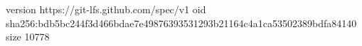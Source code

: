 version https://git-lfs.github.com/spec/v1
oid sha256:bdb5bc244f3d466bdae7e49876393531293b21164c4a1ca53502389bdfa84140
size 10778
